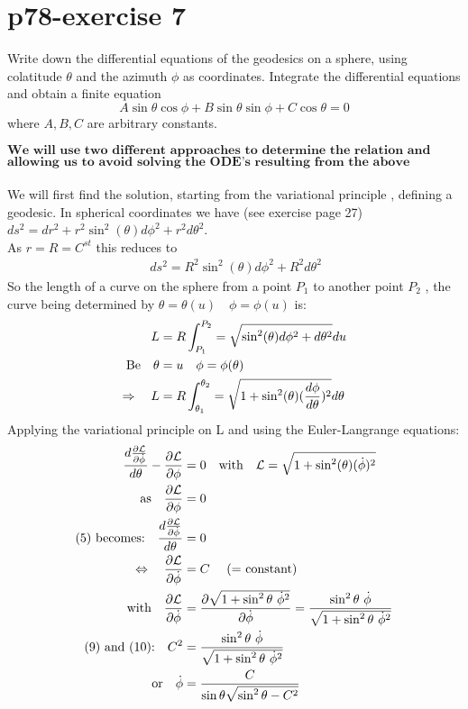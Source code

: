 \section{p78-exercise 7}
\begin{tcolorbox}
Write down the differential equations of the geodesics on a sphere, using colatitude $\theta$ and the azimuth $\phi$ as coordinates. Integrate the differential equations and obtain a finite equation $$ A\sin \theta \cos \phi + B \sin \theta \sin \phi + C\cos\theta = 0$$
where $A,B,C$ are arbitrary constants.
\end{tcolorbox}
$$\textbf{We will use two different approaches to determine the relation and finally use a geometrical reasoning }$$ $$\textbf{allowing us to avoid solving the ODE's resulting from the above mentioned approaches.}$$\\
We will first find the solution, starting from the variational principle , defining a geodesic.
In spherical coordinates we have (see exercise page 27) $ds^2 = dr^2 +  r^2\sin^2(\theta)d\phi^2+ r^2d\theta^2$.\\
As $r=R= C^{st}$ this reduces to
\begin{align}
\ ds^2 = R^2\sin^2(\theta)d\phi^2+ R^2d\theta^2
\end{align}
So the length of a curve on the sphere from a point $P_1$ to another point $P_2$ , the curve being determined by $\theta = \theta(u)\quad \phi = \phi(u)$ is:\\
\begin{align}
\ L &= R\int_{P_1}^{P_2} = \sqrt{\sin^2(\theta)d\phi^2+ d\theta^2}du\\
\text{Be}\quad \theta &= u \quad \phi = \phi(\theta)\\
\Rightarrow \quad  L &= R\int_{\theta_1}^{\theta_2} = \sqrt{1+\sin^2(\theta)(\dv{\phi}{\theta})^2}d\theta
\end{align}
Applying the variational principle on L and using the Euler-Langrange equations:
\begin{align}
 \dv{\pdv{\mathcal{L}}{\dot{\phi}}}{\theta} - \pdv{\mathcal{L}}{\phi}&=0 \quad 
 \text{with}\quad \mathcal{L} = \sqrt{1+\sin^2(\theta)(\dot{\phi})^2}\\
 \text{as}\quad  \pdv{\mathcal{L}}{\phi}&=0\\
 \text{(5) becomes:} \quad \dv{\pdv{\mathcal{L}}{\dot{\phi}}}{\theta} &=0\\
 \Leftrightarrow \quad \pdv{\mathcal{L}}{\dot{\phi}} &= C\quad \ \text{(= constant)}\\
\text{with}\quad \pdv{\mathcal{L}}{\dot{\phi}} &= \pdv{\sqrt{1+\sin^2 \theta   \  \dot{\phi}^2 }}{\dot{\phi}}= \frac{\sin^2 \theta \  \dot{\phi}}{ \sqrt{1+\sin^2 \theta \ \dot{\phi}^2 }}\\
\text{(9) and (10):}\quad C^2 &= \frac{\sin^2 \theta \  \dot{\phi}}{ \sqrt{1+\sin^2 \theta \ \dot{\phi}^2 }} \\
\text{or}\quad \dot{\phi} &= \frac{C}{\sin \theta \sqrt{\sin^2 \theta - C^2}}
\end{align}
